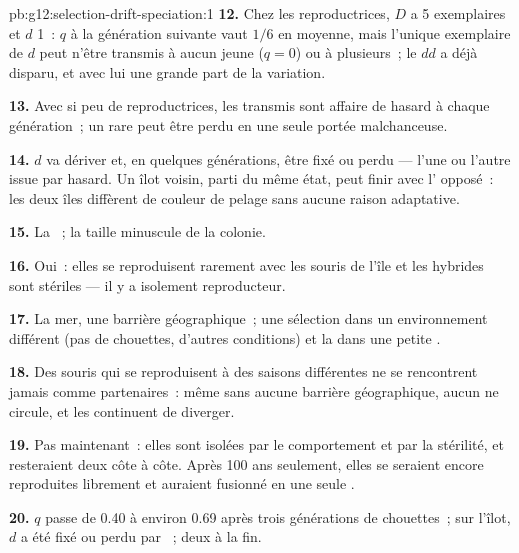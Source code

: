 \begin{solution}{pb:g12:selection-drift-speciation:1}
\textbf{12.} Chez les reproductrices, $D$ a 5 exemplaires et $d$ 1~:
$q$ à la génération suivante vaut $1/6$ en moyenne, mais l'unique
exemplaire de $d$ peut n'être transmis à aucun jeune ($q = 0$) ou à
plusieurs~; le  $dd$ a déjà disparu, et avec lui une grande
part de la variation.

\textbf{13.} Avec si peu de reproductrices, les  transmis sont
affaire de hasard à chaque génération~; un  rare peut être perdu
en une seule portée malchanceuse.

\textbf{14.} $d$ va dériver et, en quelques générations, être fixé ou
perdu --- l'une ou l'autre issue par hasard. Un îlot voisin, parti du
même état, peut finir avec l' opposé~: les deux îles diffèrent de
couleur de pelage sans aucune raison adaptative.

\textbf{15.} La ~; la taille minuscule de la colonie.

\textbf{16.} Oui~: elles se reproduisent rarement avec les souris de
l'île et les hybrides sont stériles --- il y a isolement reproducteur.

\textbf{17.} La mer, une barrière géographique~; une sélection dans un
environnement différent (pas de chouettes, d'autres conditions) et la
 dans une petite .

\textbf{18.} Des souris qui se reproduisent à des saisons différentes
ne se rencontrent jamais comme partenaires~: même sans aucune barrière
géographique, aucun  ne circule, et les  continuent de
diverger.

\textbf{19.} Pas maintenant~: elles sont isolées par le comportement et
par la stérilité, et resteraient deux  côte à côte. Après 100
ans seulement, elles se seraient encore reproduites librement et
auraient fusionné en une seule .

\textbf{20.} $q$ passe de 0.40 à environ 0.69 après trois générations
de chouettes~; sur l'îlot, $d$ a été fixé ou perdu par ~; deux  à la fin.
\end{solution}
